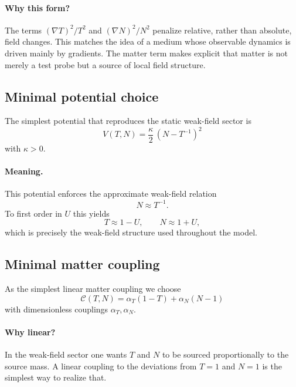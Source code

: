 \documentclass[11pt,a4paper]{article}
\begin{document}
\paragraph{Why this form?}
The terms $(\nabla T)^2/T^2$ and $(\nabla N)^2/N^2$ penalize relative, rather than absolute, field changes. This matches the idea of a medium whose observable dynamics is driven mainly by gradients. The matter term makes explicit that matter is not merely a test probe but a source of local field structure.

\subsection{Minimal potential choice}
The simplest potential that reproduces the static weak-field sector is
\begin{equation}
\boxed{
V(T,N)=\frac{\kappa}{2}\,(N-T^{-1})^2
}
\end{equation}
with $\kappa>0$.

\paragraph{Meaning.}
This potential enforces the approximate weak-field relation
\begin{equation}
N \approx T^{-1}.
\end{equation}
To first order in $U$ this yields
\begin{equation}
 T \approx 1-U,
 \qquad
 N \approx 1+U,
\end{equation}
which is precisely the weak-field structure used throughout the model.

\subsection{Minimal matter coupling}
As the simplest linear matter coupling we choose
\begin{equation}
\boxed{
\mathcal C(T,N)=\alpha_T(1-T)+\alpha_N(N-1)
}
\end{equation}
with dimensionless couplings $\alpha_T,\alpha_N$.

\paragraph{Why linear?}
In the weak-field sector one wants $T$ and $N$ to be sourced proportionally to the source mass. A linear coupling to the deviations from $T=1$ and $N=1$ is the simplest way to realize that.
\end{document}
